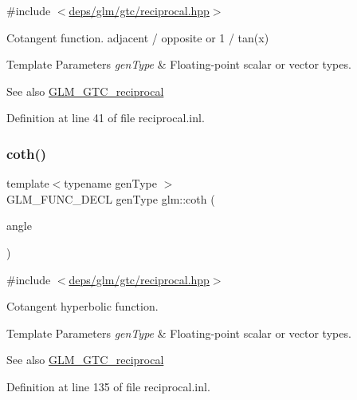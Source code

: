 {\ttfamily \#include $<$\hyperlink{reciprocal_8hpp}{deps/glm/gtc/reciprocal.\+hpp}$>$}

Cotangent function. adjacent / opposite or 1 / tan(x)


\begin{DoxyTemplParams}{Template Parameters}
{\em gen\+Type} & Floating-\/point scalar or vector types.\\
\hline
\end{DoxyTemplParams}
\begin{DoxySeeAlso}{See also}
\hyperlink{group__gtc__reciprocal}{G\+L\+M\+\_\+\+G\+T\+C\+\_\+reciprocal} 
\end{DoxySeeAlso}


Definition at line 41 of file reciprocal.\+inl.

\mbox{\label{group__gtc__reciprocal_ga6b8b770eb7198e4dea59d52e6db81442}} 
\subsubsection{\texorpdfstring{coth()}{coth()}}
{\footnotesize\ttfamily template$<$typename gen\+Type $>$ \\
G\+L\+M\+\_\+\+F\+U\+N\+C\+\_\+\+D\+E\+CL gen\+Type glm\+::coth (\begin{DoxyParamCaption}\item[{gen\+Type}]{angle }\end{DoxyParamCaption})}



{\ttfamily \#include $<$\hyperlink{reciprocal_8hpp}{deps/glm/gtc/reciprocal.\+hpp}$>$}

Cotangent hyperbolic function.


\begin{DoxyTemplParams}{Template Parameters}
{\em gen\+Type} & Floating-\/point scalar or vector types.\\
\hline
\end{DoxyTemplParams}
\begin{DoxySeeAlso}{See also}
\hyperlink{group__gtc__reciprocal}{G\+L\+M\+\_\+\+G\+T\+C\+\_\+reciprocal} 
\end{DoxySeeAlso}


Definition at line 135 of file reciprocal.\+inl.

